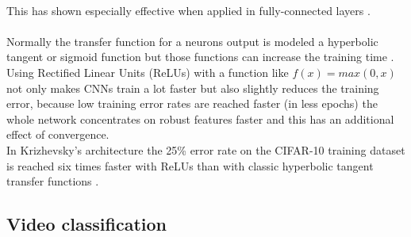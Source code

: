 \documentclass[12pt,twoside]{article}
\theoremstyle{plain}
\theoremstyle{definition}
\theoremstyle{remark}
\begin{document}
\\
This has shown especially effective when applied in fully-connected layers \cite{ImangeNetClassificationCNN-Krizhevsky}.
\\
\\
Normally the transfer function for a neurons output is modeled a hyperbolic tangent or sigmoid function but those functions can increase the training time \cite{ImangeNetClassificationCNN-Krizhevsky}. Using Rectified Linear Units (ReLUs) \cite{RectifiedLinearUnits-Hinton} with a function like $f(x) = max(0, x)$ not only makes CNNs train a lot faster but also slightly reduces the training error, because low training error rates are reached faster (in less epochs) the whole network concentrates on robust features faster and this has an additional effect of convergence.
\\
In Krizhevsky's architecture the 25\% error rate on the CIFAR-10 training dataset is reached six times faster with ReLUs than with classic hyperbolic tangent transfer functions \cite{ImangeNetClassificationCNN-Krizhevsky}.


\subsection{Video classification}
\end{document}
